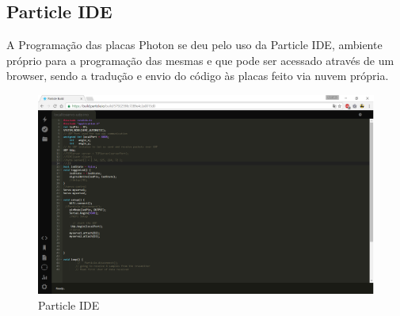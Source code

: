 	\subsection{Particle IDE}\label{subsec-particleIDE}
	A Programação das placas Photon se deu pelo uso da Particle IDE, ambiente próprio para a programação das mesmas e que pode ser acessado através de um browser, sendo a tradução e envio do código às placas feito via nuvem própria.
			\begin{figure}[h!]
		\caption{\label{fig_particleIDE} Particle IDE  }
		\begin{center}
			\includegraphics[width=\textwidth]{ParticleIDE.png}	
		\end{center}
	\end{figure}
	
	